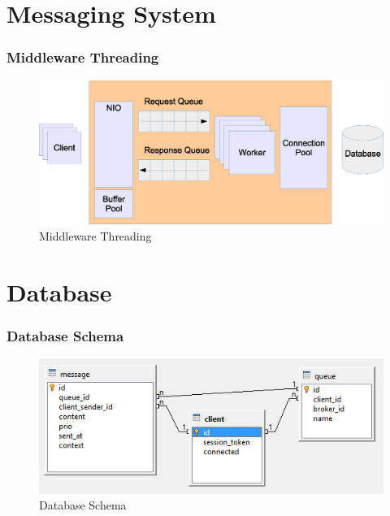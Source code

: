 \documentclass{beamer}
\begin{document}

\section{Messaging System}

\begin{frame}
\frametitle{Middleware Threading}
\begin{figure}
  \begin{center}
    \includegraphics[scale=0.4]{../../drawings/broker-threading.eps}
  \end{center}
  \caption{Middleware Threading}
  \label{fig:middleware-threading}
\end{figure}

\end{frame}



\section{Database}
\begin{frame}
\frametitle{Database Schema}

\begin{figure}
  \begin{center}
    \includegraphics[scale=0.6]{../../database/db-schema.png}
  \end{center}
  \caption{Database Schema}
  \label{fig:db-schema}
\end{figure}
\end{frame}
\end{document}
